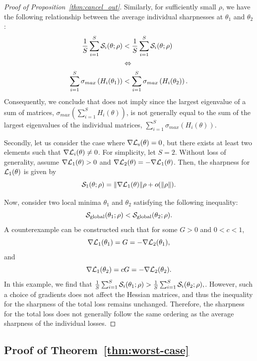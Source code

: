 \documentclass{article}
\theoremstyle{plain}
\theoremstyle{definition}
\theoremstyle{remark}
\begin{document}
\begin{proof}[Proof of Proposition~\ref{thm:cancel_out}]
Similarly, for sufficiently small $\rho$, we have the following relationship between the average individual sharpnesses at $\theta_1$ and $\theta_2$:
\begin{align}
\frac{1}{S}\sum_{i=1}^S {\mathcal{S}}_i(\theta;\rho)&< \frac{1}{S}\sum_{i=1}^S {\mathcal{S}}_i(\theta;\rho) \label{ineq:sp_average}\\ &\Leftrightarrow \nonumber\\
\sum_{i=1}^S \sigma_{max}\left(H_i(\theta_1)\right) &< \sum_{i=1}^S \sigma_{max}\left(H_i(\theta_2)\right).\label{ineq:sp_average2}
\end{align}
Consequently, we conclude that  does not imply  since the largest eigenvalue of a sum of matrices, $\sigma_{max}\left(\sum_{i=1}^S H_i(\theta)\right)$, is not generally equal to the sum of the largest eigenvalues of the individual matrices, $\sum_{i=1}^S \sigma_{max}\left( H_i(\theta)\right)$. 

Secondly, let us consider the case where $\nabla {\mathcal{L}}_{\text{s}}(\theta)=0$, but there exists at least two elements such that $\nabla {\mathcal{L}}_{i}(\theta) \neq 0$. For simplicity, let $S=2$. Without loss of generality, assume $\nabla {\mathcal{L}}_{1}(\theta)>0$ and $\nabla {\mathcal{L}}_{2}(\theta) = -\nabla {\mathcal{L}}_{1}(\theta)$. Then, the sharpness for ${\mathcal{L}}_{1}(\theta)$ is given by 
$$
{\mathcal{S}}_{1}(\theta;\rho) = \|\nabla {\mathcal{L}}_{1}(\theta)\|\rho + o(\|\rho\|). 
$$

Now, consider two local minima $\theta_1$ and $\theta_2$ satisfying the following inequality:
$$
{\mathcal{S}}_{\text{global}}(\theta_1;\rho) < {\mathcal{S}}_{\text{global}}(\theta_2;\rho). 
$$
A counterexample can be constructed such that for some $G>0$ and $0<c<1$,
$$
\nabla {\mathcal{L}}_{1}(\theta_1) = G = -\nabla {\mathcal{L}}_{2}(\theta_1),
$$
and 
$$
\nabla {\mathcal{L}}_{1}(\theta_2) = cG = -\nabla {\mathcal{L}}_{2}(\theta_2).
$$
In this example, we find that \(\frac{1}{S} \sum_{i=1}^{S} {\mathcal{S}}_i(\theta_1;\rho) > \frac{1}{S} \sum_{i=1}^{S} {\mathcal{S}}_i(\theta_2;\rho),\).  However, such a choice of gradients does not affect the Hessian matrices, and thus the inequality for the sharpness of the total loss remains unchanged. Therefore, the sharpness for the total loss does not generally follow the same ordering as the average sharpness of the individual losses. 
\end{proof}

\subsection{Proof of Theorem~\ref{thm:worst-case}}\label{app:proof_worst_case}
\end{document}
